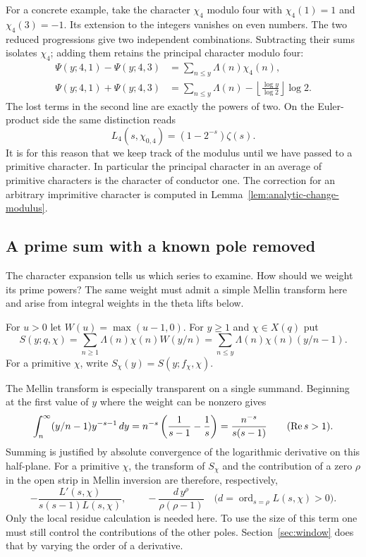 For a concrete example, take the character \(\chi_4\) modulo four
with \(\chi_4(1)=1\) and \(\chi_4(3)=-1\). Its extension to the
integers vanishes on even numbers. The two reduced progressions give
two independent combinations. Subtracting their sums isolates
\(\chi_4\); adding them retains the principal character modulo four:
\begin{align*}
 \Psi(y;4,1)-\Psi(y;4,3)&=\sum_{n\le y}\Lambda(n)\chi_4(n),\\
 \Psi(y;4,1)+\Psi(y;4,3)&=\sum_{n\le y}\Lambda(n)
              -\left\lfloor\frac{\log y}{\log 2}\right\rfloor\log 2.
\end{align*}
The lost terms in the second line are exactly the powers of two.
On the Euler-product side the same distinction reads
\[
        L_4(s,\chi_{0,4})=(1-2^{-s})\zeta(s).
\]
It is for this reason that we keep track of the modulus until we have
passed to a primitive character. In particular the principal
character in an average of primitive characters is the character of
conductor one. The correction for an arbitrary imprimitive character
is computed in Lemma~\ref{lem:analytic-change-modulus}.

\subsection{A prime sum with a known pole removed}

The character expansion tells us which series to examine. How should we weight its
prime powers? The same weight must admit a simple Mellin transform here and arise from
integral weights in the theta lifts below.
\begin{definition}\label{def:smoothed-prime-sum}
For \(u>0\) let \(W(u)=\max(u-1,0)\). For \(y\ge1\) and
\(\chi\in X(q)\) put
\begin{equation}\label{eq:smoothed-sum}
 S(y;q,\chi)=\sum_{n\ge1}\Lambda(n)\chi(n)W(y/n)
            =\sum_{n\le y}\Lambda(n)\chi(n)(y/n-1).
\end{equation}
For a primitive \(\chi\), write \(S_\chi(y)=S(y;f_\chi,\chi)\).
\end{definition}


The Mellin transform is especially transparent on a single summand.
Beginning at the first value of \(y\) where the weight can be nonzero gives
\[
 \int_n^\infty (y/n-1)y^{-s-1}\,dy
       =n^{-s}\left(\frac1{s-1}-\frac1s\right)
       =\frac{n^{-s}}{s(s-1)}\qquad(\operatorname{Re} s>1).
\]
Summing is justified by absolute convergence of the logarithmic
derivative on this half-plane. For a primitive \(\chi\), the transform
of \(S_\chi\) and the contribution of a zero \(\rho\) in the open
strip in Mellin inversion are therefore, respectively,
\[
 -\frac{L'(s,\chi)}{s(s-1)L(s,\chi)},\qquad
       -\frac{d\,y^\rho}{\rho(\rho-1)}
           \quad\bigl(d=\operatorname{ord}_{s=\rho}L(s,\chi)>0\bigr).
\]
Only the local residue calculation is needed here. To use the size of
this term one must still control the contributions of the other poles.
Section~\ref{sec:window} does that by varying the order of a derivative.

